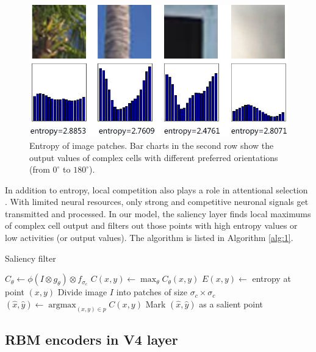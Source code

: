 \documentclass[10pt]{article}
\begin{document}
\begin{figure}
\centerline{\includegraphics[width=0.8\linewidth]{images/fig-5.jpg}} 
\caption{Entropy of image patches.
Bar charts in the second row show the output values of complex cells
with different preferred orientations (from $0^\circ$ to $180^\circ$).}
\label{fig:5}
\end{figure}

In addition to entropy, 
local competition also plays a role in attentional selection \cite{desimone1995}.
With limited neural resources, only strong and competitive neuronal signals get transmitted and processed.
In our model, the saliency layer finds local maximums of complex cell output
and filters out those points with high entropy values or low activities (or output values).
The algorithm is listed in Algorithm \ref{alg:1}.

\begin{algorithm}
  \caption{Saliency filter}
  \label{alg:1}
  \begin{algorithmic}[1]
        \State $C_{\theta}\leftarrow\phi(I\otimes g_{\theta})\otimes f_{\sigma_c}$
      \EndFor
        \State $C(x,y)\leftarrow\max_{\theta}C_{\theta}(x,y)$
        \State $E(x,y)\leftarrow$ entropy at point $(x,y)$
      \EndFor
      \State Divide image $I$ into patches of size $\sigma_c\times\sigma_c$
        \State $(\hat{x},\hat{y})\leftarrow\operatorname{argmax}_{(x,y)\in p}C(x,y)$
          \State Mark $(\hat{x},\hat{y})$ as a salient point
        \EndIf
      \EndFor
    \EndProcedure
  \end{algorithmic}
\end{algorithm}

\subsection{RBM encoders in V4 layer}
\end{document}

